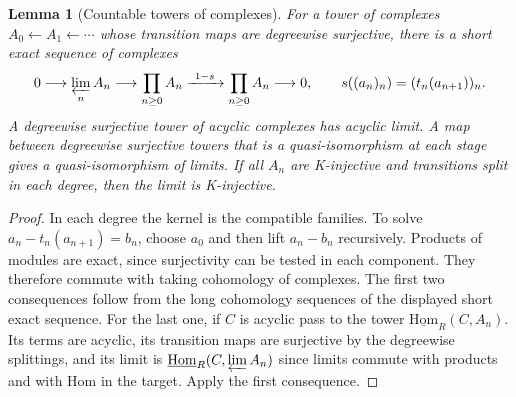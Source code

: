 \documentclass[11pt,oneside,openany]{book}
\newtheorem{lemma}[theorem]{Lemma}
\theoremstyle{definition}
\theoremstyle{remark}
\begin{document}
\begin{lemma}[Countable towers of complexes]\label{res:U05}
For a tower of complexes \(A_0\leftarrow A_1\leftarrow\cdots\)
whose transition maps are degreewise surjective, there is a short
exact sequence of complexes
\[
 0\longrightarrow\varprojlim_n A_n\longrightarrow
 \prod_{n\geq0} A_n
 \xrightarrow{\ 1-s\ }\prod_{n\geq0} A_n
 \longrightarrow0,
\qquad
 s((a_n)_n)=(t_n(a_{n+1}))_n .
\]
A degreewise surjective tower of acyclic complexes has acyclic
limit. A map between degreewise surjective towers that is a
quasi-isomorphism at each stage gives a quasi-isomorphism of
limits. If all \(A_n\) are K-injective and transitions split
in each degree, then the limit is K-injective.
\end{lemma}
\begin{proof}
In each degree the kernel is the compatible families.
To solve \(a_n-t_n(a_{n+1})=b_n\), choose \(a_0\) and then
lift \(a_n-b_n\) recursively. Products of modules are exact,
since surjectivity can be tested in each component. They
therefore commute with taking cohomology of complexes.
The first two consequences follow from the long cohomology
sequences of the displayed short exact sequence.
For the last one, if \(C\) is acyclic pass to the tower
\(\underline{\mathrm{Hom}}_R(C,A_n)\). Its terms are acyclic,
its transition maps are surjective by the degreewise splittings,
and its limit is \(\underline{\mathrm{Hom}}_R(C,\varprojlim A_n)\)
since limits commute with products and with Hom in the target.
Apply the first consequence.
\end{proof}
\end{document}
